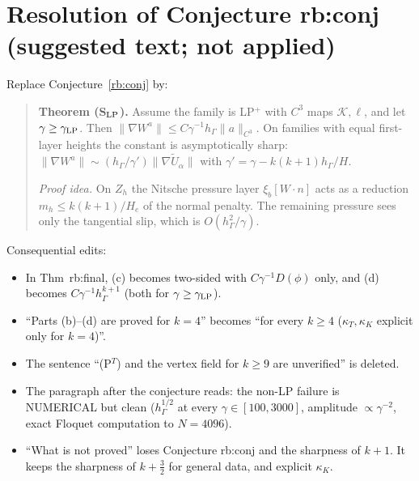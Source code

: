 \documentclass[11pt]{article}
\theoremstyle{remark}
\newcommand{\hG}{h_\Gamma}
\begin{document}
\section{Resolution of Conjecture rb:conj (suggested text; not applied)}
Replace Conjecture~\ref{rb:conj} by:

\begin{quote}\small
\textbf{Theorem (S$_{\rm LP}$).} Assume the family is LP$^+$ with $C^3$ maps $\mathcal K,\ell$, and let $\gamma\ge\gamma_{\rm LP}$. Then
$\|\nabla W^a\|\le C\gamma^{-1}\hG\|a\|_{C^3}$. On families with equal first-layer heights the constant is asymptotically sharp:
$\|\nabla W^a\|\sim(\hG/\gamma')\|\nabla\tilde U_\alpha\|$ with $\gamma'=\gamma-k(k+1)\hG/H$.

\emph{Proof idea.} On $Z_h$ the Nitsche pressure layer $\xi_b[W\cdot n]$ acts as a reduction $m_h\le k(k+1)/H_e$ of the normal penalty. The remaining
pressure sees only the tangential slip, which is $O(\hG^2/\gamma)$.
\end{quote}

\noindent Consequential edits:
\begin{itemize}
\item In Thm~rb:final, (c) becomes two-sided with $C\gamma^{-1}D(\phi)$ only, and (d) becomes $C\gamma^{-1}\hG^{k+1}$ (both for $\gamma\ge\gamma_{\rm LP}$).
\item ``Parts (b)--(d) are proved for $k=4$'' becomes ``for every $k\ge4$ ($\kappa_T,\kappa_K$ explicit only for $k=4$)''.
\item The sentence ``(P$^T$) and the vertex field for $k\ge9$ are unverified'' is deleted.
\item The paragraph after the conjecture reads: the non-LP failure is NUMERICAL but clean ($\hG^{1/2}$ at every
$\gamma\in[100,3000]$, amplitude $\propto\gamma^{-2}$, exact Floquet computation to $N=4096$).
\item ``What is not proved'' loses Conjecture rb:conj and the sharpness of $k+1$. It keeps the sharpness of $k+\frac32$ for general data, and
explicit $\kappa_K$.
\end{itemize}
\end{document}
